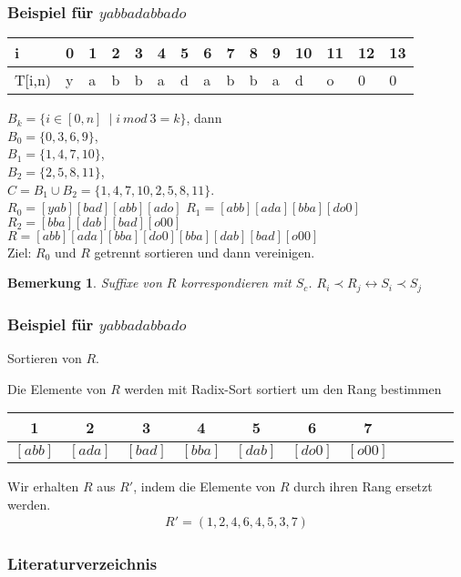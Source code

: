 \documentclass{beamer}
\newtheorem{remark}{Bemerkung}
\begin{document}
\begin{frame}[fragile]
\frametitle{Beispiel für $yabbadabbado$}
\begin{table}
\begin{tabular}{l|l l l l l l l l l l l l l l}
    \toprule
    i & 0 & 1 & 2 & 3 & 4 & 5 & 6 & 7 & 8 & 9 & 10 & 11 & 12 & 13 \\
    \midrule
    T[i,n) & y & a & b & b & a & d & a & b & b & a & d & o & 0 & 0  \\
    \bottomrule
\end{tabular}
\end{table}
$B_k = \{ i \in [0,n]\ \mid i \: mod \: 3 = k \}$, dann \\
$B_0 = \{0, 3, 6, 9 \}$,                                \\
$B_1 = \{1, 4, 7, 10 \}$,                               \\
$B_2 = \{2, 5, 8, 11 \}$,                               \\
\medskip
$C   = B_1 \cup B_2 = \{1, 4, 7, 10, 2, 5, 8, 11\}$.    \\
\medskip
$R_0 = [yab][bad][abb][ado]$
$R_1 = [abb][ada][bba][do0]$                            \\
$R_2 = [bba][dab][bad][o00]$                            \\
\medskip
$R   = [abb][ada][bba][do0][bba][dab][bad][o00]$        \\
\medskip
Ziel: $R_0$ und $R$ getrennt sortieren und dann vereinigen.
\begin{remark}
Suffixe von $R$ korrespondieren mit $S_c$. $R_i \prec R_j \leftrightarrow S_i \prec S_j$
\end{remark}
\end{frame}

\begin{frame}[fragile]
\frametitle{Beispiel für $yabbadabbado$}
\begin{description}[l]
    \item[Schritt 1:] Sortieren von $R$.
\end{description}
Die Elemente von $R$ werden mit Radix-Sort sortiert um den Rang bestimmen
\begin{table}
\begin{tabular}{c c c c c c c c c c c}
    \toprule
    1 & 2 & 3 & 4 & 5 & 6 & 7                                           \\
    \midrule
    $[abb]$ & $[ada]$ & $[bad]$ & $[bba]$ & $[dab]$ & $[do0]$ & $[o00]$ \\
    \bottomrule
\end{tabular}
\end{table}
Wir erhalten $R$ aus $R'$, indem die Elemente von $R$ durch ihren Rang ersetzt werden.
\begin{gather*}
    R' = (1,2,4,6,4,5,3,7)
\end{gather*}
\end{frame}

\begin{frame}[allowframebreaks]
\frametitle{Literaturverzeichnis}
\nocite{*}

\end{frame}
\end{document}
